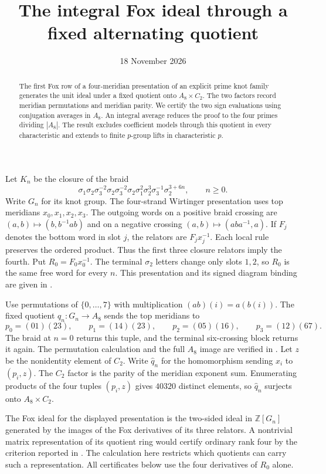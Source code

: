\documentclass[11pt]{article}
\title{The integral Fox ideal through a fixed alternating quotient}
\author{}
\date{18 November 2026}
\newcommand{\Z}{\mathbb Z}
\begin{document}
\maketitle
\begin{abstract}
The first Fox row of a four-meridian presentation of an explicit
prime knot family generates the unit ideal under a fixed quotient onto
$A_8\times C_2$. The two factors record meridian permutations and
meridian parity. We certify the two sign evaluations using conjugation
averages in $A_8$. An integral average reduces the proof to the four
primes dividing $|A_8|$. The result excludes coefficient models through
this quotient in every characteristic and extends to finite $p$-group
lifts in characteristic $p$.
\end{abstract}

Let $K_n$ be the closure of the braid
\begin{equation}\label{eq:braid}
\sigma_1\sigma_2\sigma_3^{-2}\sigma_2\sigma_3^{-2}\sigma_2
\sigma_1^2\sigma_2^3\sigma_3^{-1}\sigma_2^{3+6n},\qquad n\ge0.
\end{equation}
Write $G_n$ for its knot group. The four-strand Wirtinger presentation
uses top meridians $x_0,x_1,x_2,x_3$. The outgoing words on a positive
braid crossing are $(a,b)\mapsto(b,b^{-1}ab)$ and on a negative crossing
$(a,b)\mapsto(aba^{-1},a)$. If $F_j$ denotes the bottom word in slot
$j$, the relators are $F_jx_j^{-1}$. Each local rule preserves the
ordered product. Thus the first three closure relators imply the
fourth. Put $R_0=F_0x_0^{-1}$. The terminal $\sigma_2$ letters change
only slots $1,2$, so $R_0$ is the same free word for every $n$.
This presentation and its signed diagram binding are given in
\cite[Lemma~1]{fox}.

Use permutations of $\{0,\dots,7\}$ with multiplication
$(ab)(i)=a(b(i))$. The fixed quotient $q_n\colon G_n\to A_8$ sends the
top meridians to
\[
 p_0=(01)(23),\qquad p_1=(14)(23),\qquad p_2=(05)(16),\qquad
 p_3=(12)(67).
\]
The braid at $n=0$ returns this tuple, and the terminal six-crossing
block returns it again. The permutation calculation and the full
$A_8$ image are verified in \cite[Theorem~3]{fox}.
Let $z$ be the nonidentity element of $C_2$. Write $\widehat q_n$
for the homomorphism sending $x_i$ to $(p_i,z)$.
The $C_2$ factor is the parity of the meridian exponent sum. Enumerating
products of the four tuples $(p_i,z)$ gives $40320$ distinct elements,
so $\widehat q_n$ surjects onto $A_8\times C_2$.

The Fox ideal for the displayed presentation is the two-sided ideal
in $\Z[G_n]$ generated by the images of the Fox derivatives of its
three relators. A nontrivial matrix representation of its quotient
ring would certify ordinary rank four by the criterion reported in
\cite[Theorem~3.5]{moriah}. The calculation here restricts which
quotients can carry such a representation. All certificates below
use the four derivatives of $R_0$ alone.
\end{document}
